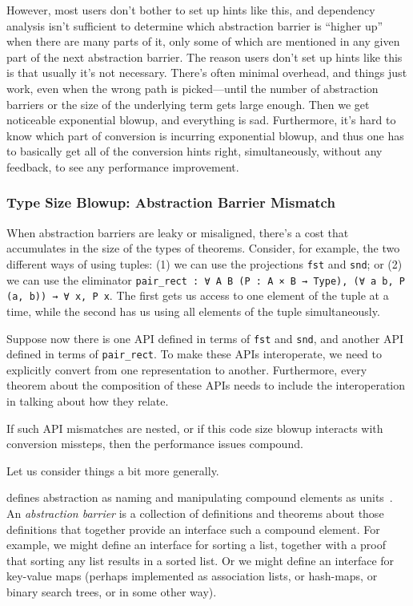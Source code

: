 However, most users don't bother to set up hints like this, and dependency analysis isn't sufficient to determine which abstraction barrier is ``higher up'' when there are many parts of it, only some of which are mentioned in any given part of the next abstraction barrier.
The reason users don't set up hints like this is that usually it's not necessary.
There's often minimal overhead, and things just work, even when the wrong path is picked---until the number of abstraction barriers or the size of the underlying term gets large enough.
Then we get noticeable exponential blowup, and everything is sad.
Furthermore, it's hard to know which part of conversion is incurring exponential blowup, and thus one has to basically get all of the conversion hints right, simultaneously, without any feedback, to see any performance improvement.



\subsubsection{Type Size Blowup: Abstraction Barrier Mismatch} \label{sec:abstraction-barriers:mismatch}
When abstraction barriers are leaky or misaligned, there's a cost that accumulates in the size of the types of theorems.
Consider, for example, the two different ways of using tuples:
(1) we can use the projections \texttt{fst} and \texttt{snd}; or
(2) we can use the eliminator \texttt{pair_rect : ∀ A B (P : A × B → Type), (∀ a b, P (a, b)) → ∀ x, P x}.
The first gets us access to one element of the tuple at a time, while the second has us using all elements of the tuple simultaneously.

Suppose now there is one API defined in terms of \texttt{fst} and \texttt{snd}, and another API defined in terms of \texttt{pair_rect}.
To make these APIs interoperate, we need to explicitly convert from one representation to another.
Furthermore, every theorem about the composition of these APIs needs to include the interoperation in talking about how they relate.

If such API mismatches are nested, or if this code size blowup interacts with conversion missteps, then the performance issues compound.



Let us consider things a bit more generally.

 defines abstraction as naming and manipulating compound elements as units~\cite[p.~6]{Structure1996Sussman}.
An \emph{abstraction barrier} is a collection of definitions and theorems about those definitions that together provide an interface such a compound element.
For example, we might define an interface for sorting a list, together with a proof that sorting any list results in a sorted list.
Or we might define an interface for key-value maps (perhaps implemented as association lists, or hash-maps, or binary search trees, or in some other way).

